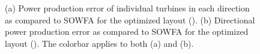 \documentclass[conf]{new-aiaa}
\begin{document}
\begin{figure}[ht]
	\centering
	\caption{(a) Power production error of individual turbines in each direction as compared to SOWFA for the optimized layout (). (b) Directional power production error as compared to SOWFA for the optimized layout ().  The colorbar applies to both (a) and (b).}
	\label{fig:optimized-power-error}
\end{figure}

\clearpage 



\end{document}
